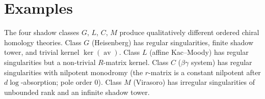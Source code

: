 \documentclass[11pt,reqno]{amsart}
\theoremstyle{definition}
\theoremstyle{remark}
\DeclareMathOperator{\av}{av}
\numberwithin{equation}{section}
\begin{document}
\section{Examples}
\label{sec:examples}

The four shadow classes $G$, $L$, $C$, $M$ produce
qualitatively different ordered chiral homology theories.
Class $G$ (Heisenberg) has regular singularities, finite
shadow tower, and trivial kernel $\ker(\av)$. Class $L$
(affine Kac--Moody) has regular singularities but a
non-trivial $R$-matrix kernel. Class $C$
($\beta\gamma$ system) has regular singularities with
nilpotent monodromy (the $r$-matrix is a constant nilpotent
after $d\log$-absorption; pole order $0$). Class $M$ (Virasoro) has irregular
singularities of unbounded rank and an infinite shadow tower.
\end{document}
